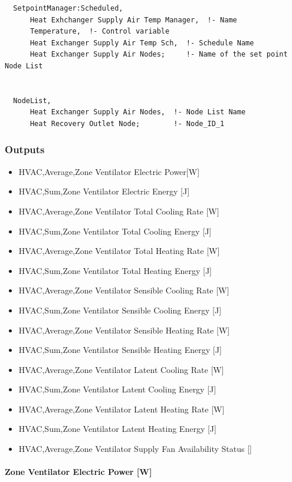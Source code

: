 \begin{lstlisting}
  SetpointManager:Scheduled,
      Heat Exhchanger Supply Air Temp Manager,  !- Name
      Temperature,  !- Control variable
      Heat Exchanger Supply Air Temp Sch,  !- Schedule Name
      Heat Exchanger Supply Air Nodes;     !- Name of the set point Node List


  NodeList,
      Heat Exchanger Supply Air Nodes,  !- Node List Name
      Heat Recovery Outlet Node;        !- Node_ID_1
\end{lstlisting}

\subsubsection{Outputs}\label{outputs-11-006}

\begin{itemize}
\item
  HVAC,Average,Zone Ventilator Electric Power{[}W{]}
\item
  HVAC,Sum,Zone Ventilator Electric Energy {[}J{]}
\item
  HVAC,Average,Zone Ventilator Total Cooling Rate {[}W{]}
\item
  HVAC,Sum,Zone Ventilator Total Cooling Energy {[}J{]}
\item
  HVAC,Average,Zone Ventilator Total Heating Rate {[}W{]}
\item
  HVAC,Sum,Zone Ventilator Total Heating Energy {[}J{]}
\item
  HVAC,Average,Zone Ventilator Sensible Cooling Rate {[}W{]}
\item
  HVAC,Sum,Zone Ventilator Sensible Cooling Energy {[}J{]}
\item
  HVAC,Average,Zone Ventilator Sensible Heating Rate {[}W{]}
\item
  HVAC,Sum,Zone Ventilator Sensible Heating Energy {[}J{]}
\item
  HVAC,Average,Zone Ventilator Latent Cooling Rate {[}W{]}
\item
  HVAC,Sum,Zone Ventilator Latent Cooling Energy {[}J{]}
\item
  HVAC,Average,Zone Ventilator Latent Heating Rate {[}W{]}
\item
  HVAC,Sum,Zone Ventilator Latent Heating Energy {[}J{]}
\item
  HVAC,Average,Zone Ventilator Supply Fan Availability Status {[]}
\end{itemize}

\paragraph{Zone Ventilator Electric Power {[}W{]}}\label{zone-ventilator-electric-power-w}

